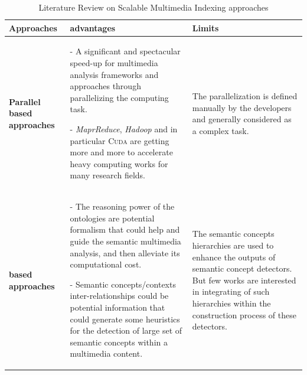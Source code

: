 		\begin{table}[hb!]
			\footnotesize
			\centering
			\caption{Literature Review on Scalable Multimedia Indexing approaches}
			\begin{tabular}{p{4.7cm}  p{4.7cm}p{4.7cm}}
				\textbf{\sffamily Approaches} & \textbf{\sffamily advantages} & \textbf{\sffamily Limits} \\  \hline
				\begin{flushleft} {\textbf{Parallel based approaches }} \end{flushleft}
				& \begin{flushleft}
					- A significant and spectacular speed-up for multimedia analysis frameworks 
					and approaches through  parallelizing the computing task. \par
					- \emph{MaprReduce}, \emph{Hadoop} and in particular \textsc{Cuda} 
					are getting more and more \revAnglais{engendered} to accelerate heavy computing 
					works for many research fields. 
				 \end{flushleft}
				& \begin{flushleft} 
					The parallelization is defined manually by the developers and 
					generally considered as a complex task.
				  \end{flushleft} \\

				\begin{flushleft} {\textbf{\revAnglais{Knowledge} based approaches}} \end{flushleft}
				& \begin{flushleft}
					- The  reasoning power of the ontologies are potential formalism that 
					could help and guide the semantic multimedia analysis, and then  
					alleviate its computational cost. \par
					- Semantic concepts/contexts inter-relationships could be potential information
					that could generate some heuristics for the detection of large set of semantic concepts
					within a multimedia content.
				 \end{flushleft}
				& \begin{flushleft} 
					The semantic concepts hierarchies are used to enhance the outputs
					of semantic concept detectors. But few works are interested in 
					integrating of such hierarchies within the construction 
					process of these detectors.
				  \end{flushleft} \\
				\hline
			\end{tabular}
			\label{review3}
		\end{table}

